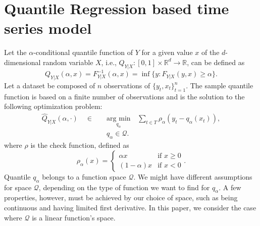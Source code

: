 \section{Quantile Regression based time series model}

Let the $\alpha$-conditional quantile function of $Y$ for a given value $x$ of the $d$-dimensional random variable $X$, i.e., $Q_{Y|X}:[0,1] \times \mathbb{R}^d \rightarrow \mathbb{R}$, can be defined as %
\begin{equation}
Q_{Y|X}(\alpha,x) = F_{Y|X}^{-1}(\alpha,x) = \inf\{y: F_{Y|X}(y,x) \geq \alpha\}.
\label{eq:quantile-function}
\end{equation}
Let a dataset be composed of $n$ observations of $\{y_t,x_t \}_{t=1}^n$. The sample quantile function is based on a finite number of observations and is the solution to the following optimization problem:
\begin{eqnarray}
\hat{Q}_{Y|X}(\alpha,\cdot)\quad\in\quad & \underset{q_{\alpha}}{\text{arg min}}\, & \sum_{t\in T}\rho_{\alpha}(y_{t}-q_{\alpha}(x_t)),\label{eq:optim-lqr1} \\
 & q_{\alpha}\in\mathcal{Q}.\label{eq:optim-lqr2}
\end{eqnarray}
where $\rho$ is the check function, defined as
\begin{equation}\label{eq:check-function}
\rho_{\alpha}(x)=\begin{cases}
\alpha x & \text{if }x\geq0\\
(1-\alpha)x & \text{if }x<0
\end{cases}.
\end{equation}
Quantile $q_\alpha$ belongs to a function space $\mathcal{Q}$. We might have different assumptions for space $\mathcal{Q}$, depending on the type of function we want to find for $q_\alpha$. A few properties, however, must be achieved by our choice of space, such as being continuous and having limited first derivative. In this paper, we consider the case where $\mathcal{Q}$ is a linear function's space.


